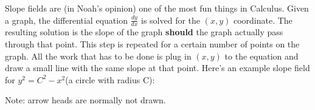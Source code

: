 \documentclass[../revisedmain.tex]{subfiles}
\begin{document}
	Slope fields are (in Noah's opinion) one of the most fun things in Calculus. Given a graph, the differential equation $\displaystyle\frac{dy}{dx}$ is solved for the $(x,y)$ coordinate. The resulting solution is the slope of the graph \textbf{should} the graph actually pass through that point. This step is repeated for a certain number of points on the graph. All the work that has to be done is plug in $(x,y)$ to the equation and draw a small line with the same slope at that point. Here's an example slope field for $y^2=C^2-x^2$(a circle with radius C):
	\begin{center}
		\def\length{sqrt(1+(x-y)^2)}
		\newline Note: arrow heads are normally not drawn.
	\end{center}
\end{document}
